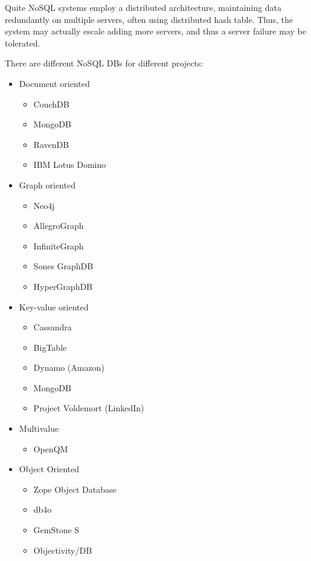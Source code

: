 Quite NoSQL systems employ a distributed architecture, maintaining data redundantly on multiple servers, often using distributed hash table. Thus, the system may actually escale adding more servers, and thus a server failure may be tolerated. \newline

There are different NoSQL DBs for different projects:

\begin{itemize}

\item Document oriented

  \begin{itemize}
    \item CouchDB
    \item MongoDB
    \item RavenDB
    \item IBM Lotus Domino
  \end{itemize}

\item Graph oriented

  \begin{itemize}
    \item Neo4j
    \item AllegroGraph
    \item InfiniteGraph
    \item Sones GraphDB
    \item HyperGraphDB
  \end{itemize}

\item Key-value oriented

  \begin{itemize}
    \item Cassandra
    \item BigTable
    \item Dynamo (Amazon)
    \item MongoDB
    \item Project Voldemort (LinkedIn)
  \end{itemize}

\item Multivalue

  \begin{itemize}
    \item OpenQM
  \end{itemize}  

\item Object Oriented
  
  \begin{itemize}
    \item Zope Object Database
    \item db4o
    \item GemStone S
    \item Objectivity/DB
  \end{itemize}


\end{itemize}
